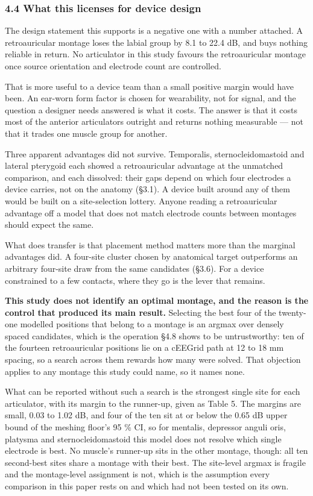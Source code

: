 \documentclass[
  11pt,
  letterpaper,
]{article}
\newcounter{none} %
\begin{document}
\subsubsection{4.4 What this licenses for device design}\label{what-this-licenses-for-device-design}

The design statement this supports is a negative one with a number attached. A
retroauricular montage loses the labial group by 8.1 to 22.4 dB, and buys
nothing reliable in return. No articulator in this study favours the
retroauricular montage once source orientation and electrode count are
controlled.

That is more useful to a device team than a small positive margin would have
been. An ear-worn form factor is chosen for wearability, not for signal, and the
question a designer needs answered is what it costs. The answer is that it costs
most of the anterior articulators outright and returns nothing measurable --- not
that it trades one muscle group for another.

Three apparent advantages did not survive. Temporalis, sternocleidomastoid and
lateral pterygoid each showed a retroauricular advantage at the unmatched
comparison, and each dissolved: their gaps depend on which four electrodes a
device carries, not on the anatomy (§3.1). A device built around any of them
would be built on a site-selection lottery. Anyone reading a retroauricular
advantage off a model that does not match electrode counts between montages
should expect the same.

What does transfer is that placement method matters more than the marginal
advantages did. A four-site cluster chosen by anatomical target outperforms an
arbitrary four-site draw from the same candidates (§3.6). For a device
constrained to a few contacts, where they go is the lever that remains.

\textbf{This study does not identify an optimal montage, and the reason is the control
that produced its main result.} Selecting the best four of the twenty-one modelled positions that belong to a montage is an argmax over densely spaced candidates, which is the
operation §4.8 shows to be untrustworthy: ten of the fourteen retroauricular
positions lie on a cEEGrid path at 12 to 18 mm spacing, so a search across them
rewards how many were solved. That objection applies to any montage this study
could name, so it names none.

What can be reported without such a search is the strongest single site for each
articulator, with its margin to the runner-up, given as Table 5. The margins are
small, 0.03 to 1.02 dB, and four of the ten sit at or below the 0.65 dB upper
bound of the meshing floor's 95 \% CI, so for mentalis, depressor anguli oris,
platysma and sternocleidomastoid this model does not resolve which single
electrode is best. No muscle's runner-up sits in the other montage, though: all
ten second-best sites share a montage with their best. The site-level argmax is
fragile and the montage-level assignment is not, which is the assumption every
comparison in this paper rests on and which had not been tested on its own.
\end{document}
